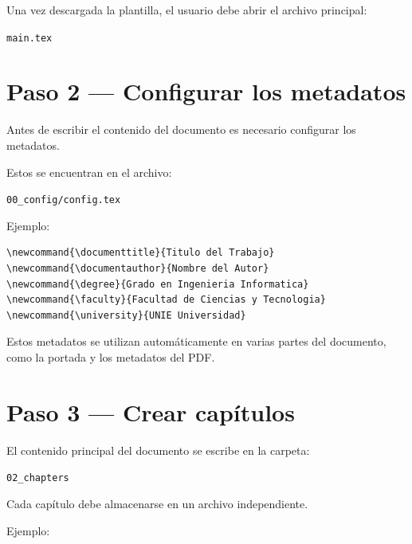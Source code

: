 Una vez descargada la plantilla, el usuario debe abrir
el archivo principal:

\texttt{main.tex}




\section{Paso 2 — Configurar los metadatos}

Antes de escribir el contenido del documento es necesario
configurar los metadatos.

Estos se encuentran en el archivo:

\texttt{00\_config/config.tex}



Ejemplo:

\begin{lstlisting}[caption={Configuración de metadatos},label={code:metadata}]
\newcommand{\documenttitle}{Titulo del Trabajo}
\newcommand{\documentauthor}{Nombre del Autor}
\newcommand{\degree}{Grado en Ingenieria Informatica}
\newcommand{\faculty}{Facultad de Ciencias y Tecnologia}
\newcommand{\university}{UNIE Universidad}
\end{lstlisting}




\begin{notebox}
Estos metadatos se utilizan automáticamente en
varias partes del documento, como la portada
y los metadatos del PDF.
\end{notebox}




\section{Paso 3 — Crear capítulos}

El contenido principal del documento se escribe en la
carpeta:

\texttt{02\_chapters}



Cada capítulo debe almacenarse en un archivo independiente.

Ejemplo:

